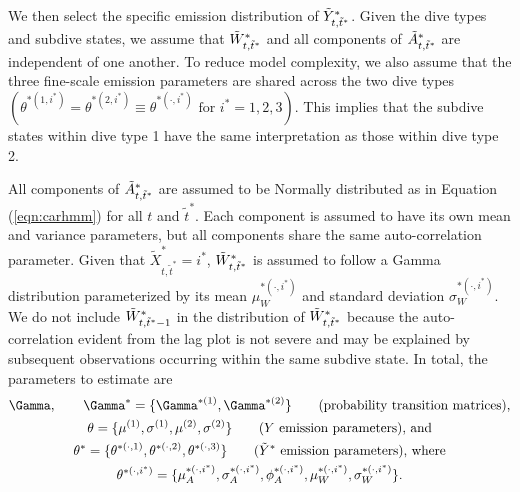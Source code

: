 We then select the specific emission distribution of $\tilde{Y}^*_{t,\tilde t^*}$. Given the dive types and subdive states, we assume that $\tilde{W}^*_{t,\tilde t^*}$ and all components of $\tilde{A}^*_{t,\tilde t^*}$ are independent of one another. To reduce model complexity, we also assume that the three fine-scale emission parameters are shared across the two dive types $\left(\theta^{*(1,i^*)} = \theta^{*(2,i^*)} \equiv \theta^{*(\cdot,i^*)} \text{ for } i^* = 1,2,3\right)$. This implies that the subdive states within dive type 1 have the same interpretation as those within dive type 2.

All components of $\tilde{A}^*_{t,\tilde t^*}$ are assumed to be Normally distributed as in Equation (\ref{eqn:carhmm}) for all $t$ and $\tilde t^*$. Each component is assumed to have its own mean and variance parameters, but all components share the same auto-correlation parameter. 
Given that $\tilde X^*_{t,\tilde t^*} = i^*$, $\tilde{W}^*_{t,\tilde t^*}$ is assumed to follow a Gamma distribution parameterized by its mean $\mu_W^{*(\cdot,i^*)}$ and standard deviation $\sigma_W^{*(\cdot,i^*)}$. We do not include $\tilde{W}^*_{t,\tilde t^*-1}$ in the distribution of $\tilde{W}^*_{t,\tilde t^*}$ because the auto-correlation evident from the lag plot is not severe and may be explained by subsequent observations occurring within the same subdive state. 
%
In total, the parameters to estimate are
%
\begin{gather*}
    \Gamma, \qquad \Gamma^{*} = \{\Gamma^{*(1)},\Gamma^{*(2)}\} \qquad \text{(probability transition matrices)}, \\
    \theta = \{\mu^{(1)},\sigma^{(1)},\mu^{(2)},\sigma^{(2)}\} \qquad \text{($Y$ emission parameters), and} \\
    \theta^* = \{\theta^{*(\cdot,1)},\theta^{*(\cdot,2)},\theta^{*(\cdot,3)}\}  \qquad \text{($\Z$ emission parameters), where} \\
    \theta^{*(\cdot,i^*)} =  \{\mu_A^{*(\cdot,i^*)},\sigma_A^{*(\cdot,i^*)},\phi_A^{*(\cdot,i^*)},\mu_W^{*(\cdot,i^*)},\sigma_W^{*(\cdot,i^*)}\}.
\end{gather*}
